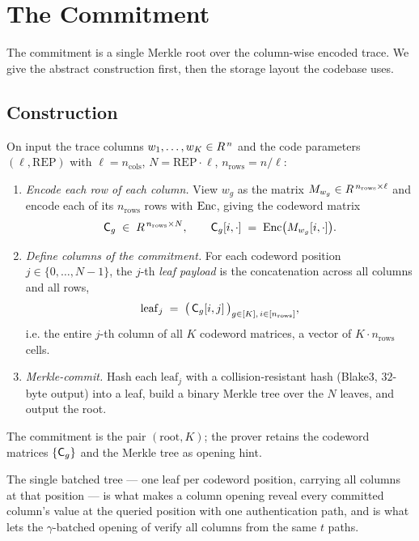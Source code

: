 \section{The Commitment}
\label{sec:commitment}

The commitment is a single Merkle root over the column-wise encoded
trace. We give the abstract construction first, then the storage layout
the codebase uses.

\subsection{Construction}

\begin{construction}[Commit]
\label{cons:commit}
On input the trace columns $w_1,\dots,w_K \in R^{\,n}$ and the
code parameters $(\ell, \mathrm{REP})$ with $\ell = n_{\mathrm{cols}}$,
$N = \mathrm{REP}\cdot\ell$, $n_{\mathrm{rows}} = n/\ell$:
\begin{enumerate}[leftmargin=2em]
  \item \emph{Encode each row of each column.} View $w_g$ as the matrix
    $M_{w_g} \in R^{\,n_{\mathrm{rows}}\times\ell}$ and encode each
    of its $n_{\mathrm{rows}}$ rows with $\operatorname{Enc}$, giving the codeword matrix
    \[
      \mathsf{C}_g \;\in\; R^{\,n_{\mathrm{rows}}\times N},
      \qquad
      \mathsf{C}_g[i,\cdot] \;=\; \operatorname{Enc}\bigl(M_{w_g}[i,\cdot]\bigr).
    \]
  \item \emph{Define columns of the commitment.} For each codeword
    position $j \in \{0,\dots,N-1\}$, the $j$-th \emph{leaf payload} is
    the concatenation across all columns and all rows,
    \[
      \mathrm{leaf}_j \;=\; \bigl(\,\mathsf{C}_g[i,j]\,\bigr)_{g \in [K],\, i \in [n_{\mathrm{rows}}]},
    \]
    i.e. the entire $j$-th column of all $K$ codeword matrices, a vector of
    $K\cdot n_{\mathrm{rows}}$ cells.
  \item \emph{Merkle-commit.} Hash each $\mathrm{leaf}_j$ with a
    collision-resistant hash (Blake3, $32$-byte output) into a leaf, build
    a binary Merkle tree over the $N$ leaves, and output the root.
\end{enumerate}
The commitment is the pair $(\mathrm{root}, K)$; the prover retains the
codeword matrices $\{\mathsf{C}_g\}$ and the Merkle tree as opening hint.
\end{construction}

The single batched tree --- one leaf per codeword position, carrying all
columns at that position --- is what makes a column opening reveal every
committed column's value at the queried position with one authentication
path, and is what lets the $\gamma$-batched opening of 
verify all columns from the same $t$ paths.

